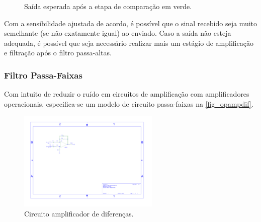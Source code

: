 	\begin{figure}[h]
		\caption{\label{plot-post-comparator} Saída esperada após a etapa de comparação em verde.}
		\centering
	\end{figure}
		
	Com a sensibilidade ajustada de acordo, é possível que o sinal recebido seja muito semelhante (se não exatamente igual) ao enviado. Caso a saída não esteja adequada, é possível que seja necessário realizar mais um estágio de amplificação e filtração após o filtro passa-altas.
	
	\subsubsection{Filtro Passa-Faixas}\label{method-hardware-bandfilter}
	
	Com intuito de reduzir o ruído em circuitos de amplificação com amplificadores operacionais, especifica-se um modelo de circuito passa-faixas na \autoref{fig_opampdif}.
	
	\begin{figure}[h!]
		\caption{\label{fig_opampdif}Circuito amplificador de diferenças.}
		\centering
		\includegraphics[width=0.6\textwidth, trim={5cm 12.29cm 17.6cm 4.3cm},clip]{circuits/opamp-dif2.pdf}
	\end{figure}
	

